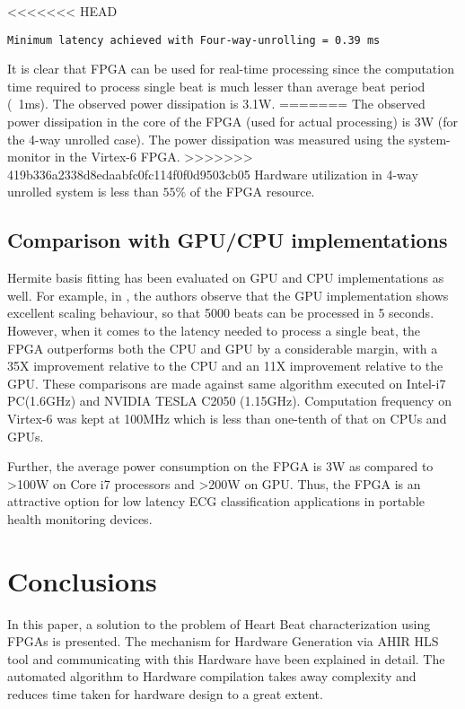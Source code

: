 \documentclass[runningheads]{llncs}
\begin{document}
<<<<<<< HEAD

\begin{verbatim}
Minimum latency achieved with Four-way-unrolling = 0.39 ms
\end{verbatim}
It is clear that FPGA can be used for real-time processing since the 
computation time required to process single beat is much lesser than
average beat period (~1ms). The observed power dissipation is 3.1W.  
=======
The observed power dissipation in the core of the 
FPGA (used for actual processing) is 3W (for the 4-way unrolled case).  The
power dissipation was measured using the system-monitor in the Virtex-6 FPGA.
>>>>>>> 419b336a2338d8edaabfc0fc114f0f0d9503cb05
Hardware utilization in 4-way unrolled system is less than $55\%$ 
of the FPGA resource.

\subsection{Comparison with GPU/CPU implementations}

Hermite basis fitting has been evaluated on GPU and CPU implementations
as well.  For example, in \cite{c:GPU}, the authors observe that
the GPU implementation shows excellent scaling behaviour, so that 
5000 beats can be processed in 5 seconds.  However, when it comes
to the latency needed to process a single beat, the FPGA outperforms both 
the CPU and GPU by a considerable margin, with a 35X improvement relative to
the CPU and an 11X improvement relative to the GPU. 
These comparisons are made against same algorithm executed on Intel-i7 PC(1.6GHz) 
and NVIDIA TESLA C2050 (1.15GHz). Computation frequency on Virtex-6 was kept at 100MHz which is
less than one-tenth of that on CPUs and GPUs. 

Further, the average power consumption on the FPGA is 3W as compared to >100W on Core i7 processors and
>200W on GPU. Thus, the FPGA is an attractive option for low latency ECG classification
applications in portable health monitoring devices.

\section{Conclusions}\label{s:conclusions}

In this paper, a solution to the problem of Heart Beat characterization using FPGAs is presented.
The mechanism for Hardware Generation via AHIR HLS tool and communicating with this Hardware have
been explained in detail. The automated algorithm to Hardware compilation takes away complexity
and reduces time taken for hardware design to a great extent.
\end{document}
